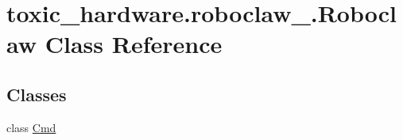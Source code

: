 \hypertarget{classtoxic__hardware_1_1roboclaw__3_1_1Roboclaw}{}\section{toxic\+\_\+hardware.\+roboclaw\+\_.\+Roboclaw Class Reference}
\label{classtoxic__hardware_1_1roboclaw__3_1_1Roboclaw}
\subsection*{Classes}
\begin{DoxyCompactItemize}
\item 
class \mbox{\hyperlink{classtoxic__hardware_1_1roboclaw__3_1_1Roboclaw_1_1Cmd}{Cmd}}
\end{DoxyCompactItemize}
